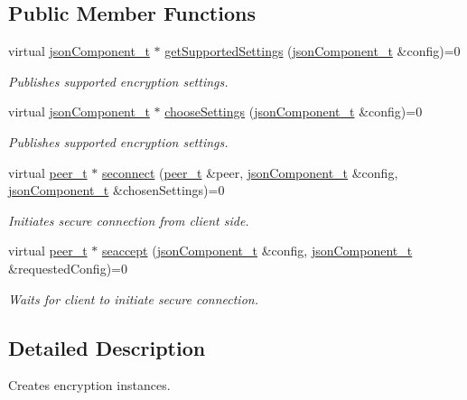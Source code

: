 \subsection*{\-Public \-Member \-Functions}
\begin{DoxyCompactItemize}
\item 
virtual \hyperlink{classjsonComponent__t}{json\-Component\-\_\-t} $\ast$ \hyperlink{classsecurityCreator__t_a9e204dba6dd07275ed250640835c5821}{get\-Supported\-Settings} (\hyperlink{classjsonComponent__t}{json\-Component\-\_\-t} \&config)=0
\begin{DoxyCompactList}\small\item\em \-Publishes supported encryption settings. \end{DoxyCompactList}\item 
virtual \hyperlink{classjsonComponent__t}{json\-Component\-\_\-t} $\ast$ \hyperlink{classsecurityCreator__t_abe5307cfc49e85f4efae194aaa32e0a8}{choose\-Settings} (\hyperlink{classjsonComponent__t}{json\-Component\-\_\-t} \&config)=0
\begin{DoxyCompactList}\small\item\em \-Publishes supported encryption settings. \end{DoxyCompactList}\item 
virtual \hyperlink{classpeer__t}{peer\-\_\-t} $\ast$ \hyperlink{classsecurityCreator__t_a034aee313d01680b4cd7538a427ffdfe}{seconnect} (\hyperlink{classpeer__t}{peer\-\_\-t} \&peer, \hyperlink{classjsonComponent__t}{json\-Component\-\_\-t} \&config, \hyperlink{classjsonComponent__t}{json\-Component\-\_\-t} \&chosen\-Settings)=0
\begin{DoxyCompactList}\small\item\em \-Initiates secure connection from client side. \end{DoxyCompactList}\item 
virtual \hyperlink{classpeer__t}{peer\-\_\-t} $\ast$ \hyperlink{classsecurityCreator__t_a3ae98b0d1f4812023d62abf7f03c569f}{seaccept} (\hyperlink{classjsonComponent__t}{json\-Component\-\_\-t} \&config, \hyperlink{classjsonComponent__t}{json\-Component\-\_\-t} \&requested\-Config)=0
\begin{DoxyCompactList}\small\item\em \-Waits for client to initiate secure connection. \end{DoxyCompactList}\end{DoxyCompactItemize}


\subsection{\-Detailed \-Description}
\-Creates encryption instances. 

